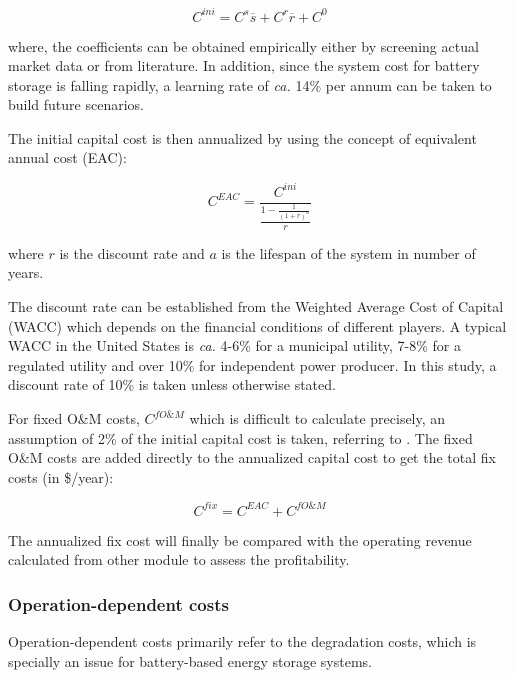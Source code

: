 \begin{equation}
\label{eq:initial-cost}
C^{ini} = C^s \overline{s} + C^r \overline{r} + C^0
\end{equation}

where, the coefficients can be obtained empirically either by screening actual market data or from literature. In addition, since the system cost for battery storage is falling rapidly, a learning rate of \textit{ca.} 14\% per annum can be taken to build future scenarios\cite{Nykvist2015}.

The initial capital cost is then annualized by using the concept of equivalent annual cost (EAC):

\begin{equation}
C^{EAC} = \frac{C^{ini}}{\frac{1 - \frac{1}{(1+r)^a}}{r}}
\end{equation}

where $r$ is the discount rate and $a$ is the lifespan of the system in number of years.

The discount rate can be established from the Weighted Average Cost of Capital (WACC) which depends on the financial conditions of different players. A typical WACC in the United States is \textit{ca.} 4-6\% for a municipal utility, 7-8\% for a regulated utility and over 10\% for independent power producer\cite{Rastler2010}. In this study, a discount rate of 10\% is taken unless otherwise stated.

For fixed O\&M costs, $C^{fO\&M}$ which is difficult to calculate precisely, an assumption of 2\% of the initial capital cost is taken, referring to \cite{Rastler2010}. The fixed O\&M costs are added directly to the annualized capital cost to get the total fix costs (in \$/year):

\begin{equation}
C^{fix} = C^{EAC} +  C^{fO\&M}
\end{equation}

The annualized fix cost will finally be compared with the operating revenue calculated from other module to assess the profitability.

\subsubsection{Operation-dependent costs}

Operation-dependent costs primarily refer to the degradation costs, which is specially an issue for battery-based energy storage systems\cite{Barre2013}.

